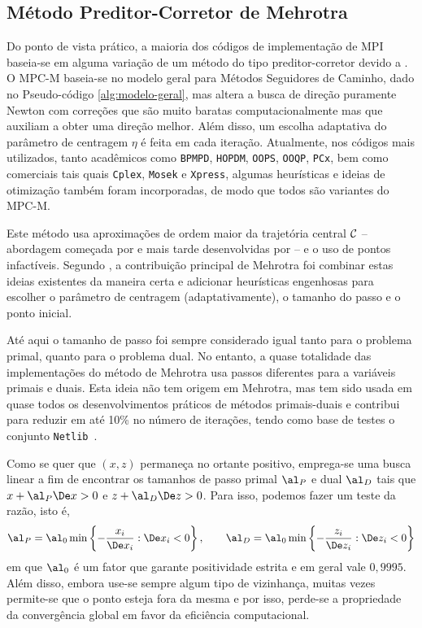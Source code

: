 \subsection{Método Preditor-Corretor de Mehrotra}
\label{sec:mehrotra-pc-method}
Do ponto de vista prático, a maioria dos códigos de implementação de \ac{MPI}
baseia-se em alguma variação de um método do tipo  preditor-corretor
 devido a \textcite{Mehrotra:1992wr}. O  \ac{MPC-M} baseia-se no modelo geral
para Métodos Seguidores de Caminho, dado no Pseudo-código
\ref{alg:modelo-geral}, mas altera a busca de direção puramente Newton com
correções que são muito baratas computacionalmente mas que auxiliam a obter uma
direção melhor. Além disso, um escolha adaptativa do parâmetro de centragem
$\eta$ é feita em cada iteração. Atualmente, nos códigos mais utilizados, tanto
acadêmicos como \texttt{BPMPD}, \texttt{HOPDM}, \texttt{OOPS}, \texttt{OOQP},
\texttt{PCx}, bem como  comerciais tais quais \texttt{Cplex}, \texttt{Mosek} e
\texttt{Xpress}, algumas heurísticas e ideias de otimização também foram
incorporadas, de modo que todos são variantes do \ac{MPC-M}.

Este método usa  aproximações de ordem maior da trajetória central $\mathcal{C}$ --
abordagem começada  por \textcite{Meggido:Pathways-to-the-optimal:1988u} e mais
tarde desenvolvidas por
\textcite{Monteiro:1990vn} -- e o uso de pontos infactíveis. Segundo \textcite[pg
194]{Wright:Primal-dual-interior-point:1997h},  a contribuição principal
de Mehrotra foi combinar estas ideias existentes da maneira certa e adicionar
heurísticas engenhosas para escolher o parâmetro de centragem (adaptativamente), o tamanho
do passo e o ponto inicial.

Até aqui o tamanho de passo foi sempre considerado igual tanto para o problema
primal, quanto para o problema dual. No entanto, a quase totalidade das
implementações do método de Mehrotra usa passos diferentes para a variáveis
primais e duais. Esta ideia não tem origem em Mehrotra, mas tem sido usada em
quase todos os desenvolvimentos práticos de métodos primais-duais e  contribui
para reduzir em até 10\% no número de iterações, tendo como base de testes o
conjunto  \texttt{Netlib}~\cite[pg.
195]{Wright:Primal-dual-interior-point:1997h}.

Como se quer que $(x,z)$ permaneça no ortante positivo, emprega-se uma busca
linear a fim de encontrar os tamanhos de passo primal $\al_P$ e dual $\al_D$  tais que
$x+\al_P\Dex >0$ e $z+\al_D\Dez >0$. Para isso, podemos fazer um teste da
razão, isto é,
\begin{equation}
\label{eq:size-step}
\al_P = \al_0\min \left\{- \frac{x_i}{\Dex_i} : \Dex_i <
0\right\}, \qquad \al_D = \al_0\min \left\{- \frac{z_i}{\Dez_i} : \Dez_i <
0\right\}
\end{equation} 
em que $\al_0$ é um fator que garante positividade estrita e em geral vale
$0,9995$. Além disso, embora use-se sempre  algum tipo de vizinhança, muitas
vezes permite-se que o ponto esteja fora da mesma e por isso, perde-se a
propriedade da convergência global em favor da eficiência computacional. 



